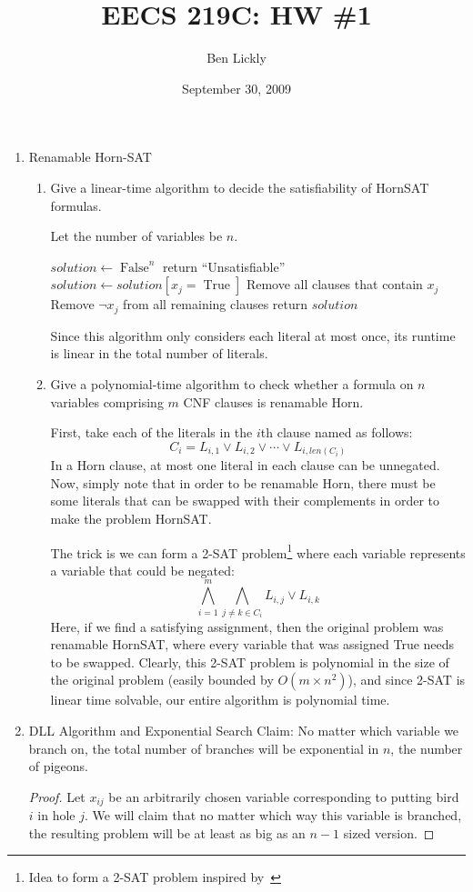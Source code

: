\documentclass{amsart}
\title{EECS 219C: HW \#1}
\author{Ben Lickly}
\date{September 30, 2009}
\begin{document}
\begin{enumerate}
  \item Renamable Horn-SAT
    \begin{enumerate}
      \item Give a linear-time algorithm to decide the satisfiability of
	HornSAT formulas.

Let the number of variables be $n$.
\begin{algorithm}
$solution \leftarrow \operatorname{False}^n$ \;
 {
   {
     return ``Unsatisfiable''
  }
  $solution \leftarrow solution[x_j = \operatorname{True}]$ \;
  Remove all clauses that contain $x_j$ \;
  Remove $\neg x_j$ from all remaining clauses \;
}
return  $solution$
\end{algorithm}
Since this algorithm only considers each literal at most once,
its runtime is linear in the total number of literals.
      \item Give a polynomial-time algorithm to check whether a formula on 
	$n$ variables comprising $m$ CNF clauses is renamable Horn.

First, take each of the literals in the $i$th clause named as follows:
\[
C_i = L_{i,1} \vee L_{i,2} \vee \cdots \vee L_{i,len(C_i)}
\]
In a Horn clause, at most one literal in each clause can be unnegated.
Now, simply note that in order to be renamable Horn, there must be some
literals that can be swapped with their complements in order to make
the problem HornSAT.

The trick is we can form a 2-SAT problem\footnote{Idea to form a 2-SAT problem inspired by~\cite{322059}} where each variable represents
a variable that could be negated:
\[
\bigwedge_{i=1}^m \bigwedge_{j \ne k \in C_i} L_{i,j} \vee L_{i,k}
\]
Here, if we find a satisfying assignment, then the original problem
was renamable HornSAT, where every variable that was assigned True
needs to be swapped. Clearly, this 2-SAT problem is polynomial in the size
of the original problem (easily bounded by $O(m \times n^2)$), and since 2-SAT
is linear time solvable, our entire algorithm is polynomial time.
    \end{enumerate}
  \item DLL Algorithm and Exponential Search
Claim: No matter which variable we branch on, the total number of branches
will be exponential in $n$, the number of pigeons.
\begin{proof}
Let $x_{ij}$ be an arbitrarily chosen variable corresponding to putting bird
$i$ in hole $j$.
We will claim that no matter which way this variable is branched, the
resulting problem will be at least as big as an $n-1$ sized version.


\end{proof}
\end{enumerate}
\end{document}
